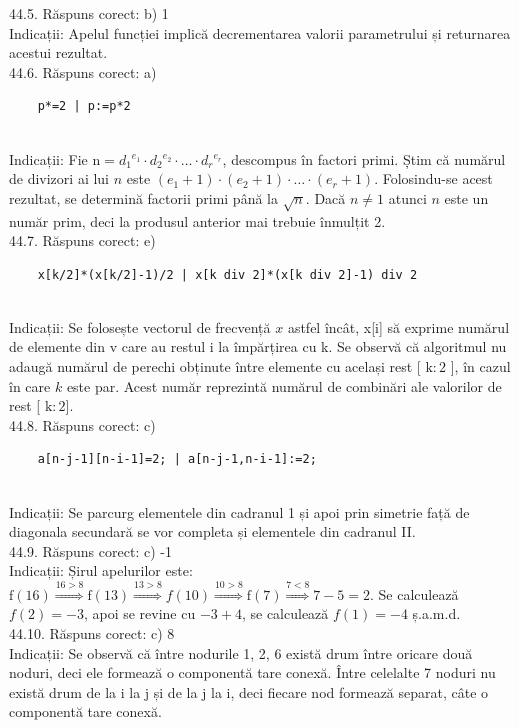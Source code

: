 44.5. Răspuns corect: b) 1\\
Indicații: Apelul funcției implică decrementarea valorii parametrului și returnarea acestui rezultat.\\

44.6. Răspuns corect: a) \begin{verbatim}
    p*=2 | p:=p*2
\end{verbatim}\\
Indicații: Fie $\mathrm{n}=d_{1}{ }^{e_{1}} \cdot d_{2}{ }^{e_{2}} \cdot \ldots \cdot d_{r}{ }^{e_{r}}$, descompus în factori primi. Ș̦tim că numărul de divizori ai lui $n$ este $\left(e_{1}+1\right) \cdot\left(e_{2}+1\right) \cdot \ldots \cdot\left(e_{r}+1\right)$. Folosindu-se acest rezultat, se determină factorii primi până la $\sqrt{n}$. Dacă $n \neq 1$ atunci $n$ este un număr prim, deci la produsul anterior mai trebuie înmulțit 2.\\

44.7. Răspuns corect: e) \begin{verbatim}
    x[k/2]*(x[k/2]-1)/2 | x[k div 2]*(x[k div 2]-1) div 2 
\end{verbatim}\\
Indicații: Se folosește vectorul de frecvență $x$ astfel încât, x[i] să exprime numărul de elemente din v care au restul i la împărțirea cu k. Se observă că algoritmul nu adaugă numărul de perechi obținute între elemente cu același rest [ $\mathrm{k}: 2$ ], în cazul în care $k$ este par. Acest număr reprezintă numărul de combinări ale valorilor de rest [ $\mathrm{k}: 2]$.\\

44.8. Răspuns corect: c) \begin{verbatim}
    a[n-j-1][n-i-1]=2; | a[n-j-1,n-i-1]:=2; 
\end{verbatim}\\
Indicații: Se parcurg elementele din cadranul 1 și apoi prin simetrie față de diagonala secundară se vor completa și elementele din cadranul II.\\

44.9. Răspuns corect: c) -1\\
Indicații: Șirul apelurilor este: $\mathrm{f}(16) \stackrel{16>8}{\Longrightarrow} \mathrm{f}(13) \stackrel{13>8}{\Longrightarrow} f(10) \stackrel{10>8}{\Longrightarrow} \mathrm{f}(7) \stackrel{7<8}{\Longrightarrow} 7-5=2$. Se calculează $f(2)=-3$, apoi se revine cu $-3+4$, se calculează $f(1)=-4$ ș.a.m.d.\\

44.10. Răspuns corect: c) 8\\
Indicații: Se observă că între nodurile 1, 2, 6 există drum între oricare două noduri, deci ele formează o componentă tare conexă. Între celelalte 7 noduri nu există drum de la i la j și de la j la i, deci fiecare nod formează separat, câte o componentă tare conexă.\\

